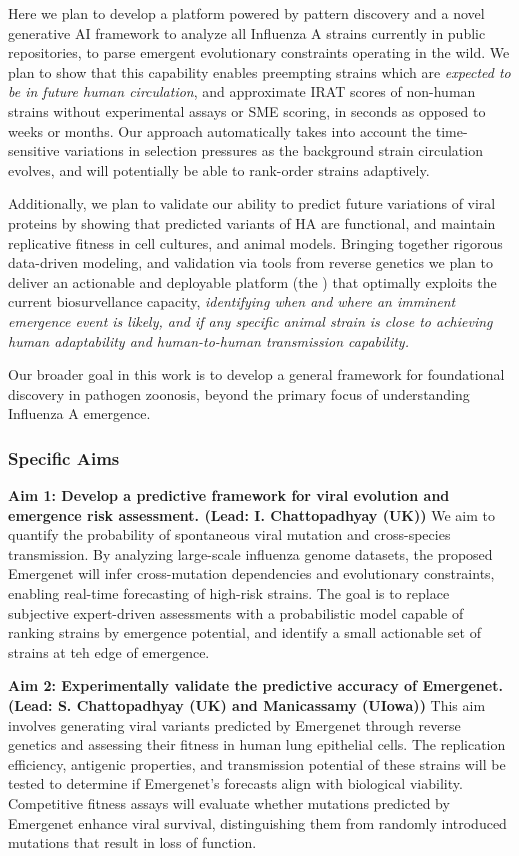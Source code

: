 \documentclass[onecolumn, compsoc,11pt]{IEEEtran}
\def\infl{Influenza A\xspace}
\begin{document}
Here we plan to develop a platform powered by  pattern discovery and a novel generative AI framework to analyze all \infl strains currently in public repositories,  to  parse  emergent evolutionary constraints operating  in the wild. We plan to show   that this capability enables preempting  strains which are \textit{expected to be in future human circulation}, and  approximate IRAT scores of non-human strains without  experimental assays or SME scoring, in seconds as opposed to weeks or months. Our approach automatically takes into account the time-sensitive variations in selection pressures as the background strain circulation evolves, and will potentially be able to rank-order strains adaptively.

Additionally, we plan to validate our ability to predict future variations of viral proteins by showing that predicted variants of HA are functional, and maintain replicative fitness in cell cultures, and animal models.   Bringing together rigorous data-driven modeling, and validation via tools from reverse genetics we plan to deliver an actionable and deployable platform (the \bnd) that optimally exploits the current biosurvellance capacity,  \textit{identifying when and where an imminent  emergence event is likely, and if any specific animal strain is close to achieving human adaptability and  human-to-human transmission capability.}

Our broader goal in this work is to develop a general framework for foundational discovery in  pathogen zoonosis,  beyond the primary focus  of understanding \infl emergence.

  \subsubsection*{Specific Aims}

\textbf{Aim 1: Develop a predictive framework for viral evolution and emergence risk assessment. (Lead: I. Chattopadhyay (UK))}  
We aim to quantify the probability of spontaneous viral mutation and cross-species transmission. By analyzing large-scale influenza genome datasets, the proposed Emergenet will infer cross-mutation dependencies and evolutionary constraints, enabling real-time forecasting of high-risk strains. The goal is to replace subjective expert-driven assessments with a probabilistic model capable of ranking strains by emergence potential, and identify a small actionable set of strains at teh edge of emergence.

\textbf{Aim 2: Experimentally validate the predictive accuracy of Emergenet. (Lead: S. Chattopadhyay (UK) and Manicassamy (UIowa)) }  
This aim involves generating viral variants predicted by Emergenet through reverse genetics and assessing their fitness in human lung epithelial cells. The replication efficiency, antigenic properties, and transmission potential of these strains will be tested to determine if Emergenet's forecasts align with biological viability. Competitive fitness assays will evaluate whether mutations predicted by Emergenet enhance viral survival, distinguishing them from randomly introduced mutations that result in loss of function.
\end{document}
